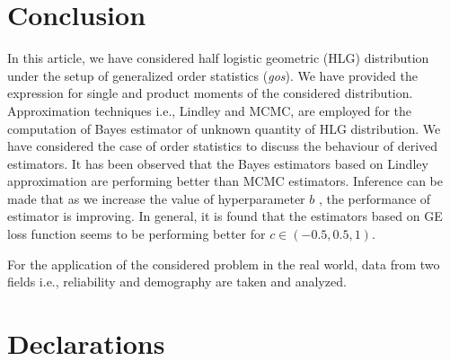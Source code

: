 \documentclass[11pt,a4paper]{article}
\numberwithin{equation}{section}
\begin{document}
	\section{Conclusion}

	In this article, we have considered half logistic geometric (HLG) distribution under the setup of generalized order statistics (\textit{gos}). We have provided the expression for single and product moments of the considered distribution. Approximation techniques i.e., Lindley and MCMC, are employed for the computation of Bayes estimator of unknown quantity of HLG distribution. We have considered the case of order statistics to discuss the behaviour of derived estimators. It has been observed that the Bayes estimators based on Lindley approximation are performing better than MCMC estimators. Inference can be made that as we increase the value of hyperparameter $b$ , the performance of estimator is improving. In general, it is found that the estimators based on GE loss function seems to be performing better for $c\in (-0.5,0.5,1)$.

	For the application of the considered problem in the real world, data from two fields i.e., reliability and demography are taken and analyzed. \\

\section*{Declarations}
\end{document}
